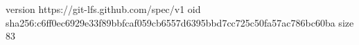 version https://git-lfs.github.com/spec/v1
oid sha256:c6ff0ec6929e33f89bbfcaf059cb6557d6395bbd7cc725c50fa57ac786bc60ba
size 83
